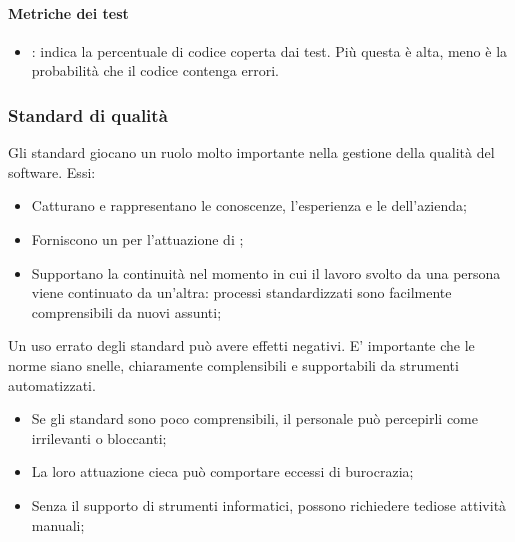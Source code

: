 \paragraph{Metriche dei test}
\label{par:metriche_dei_test}

\begin{itemize}
  \item {}: indica la percentuale di codice coperta
  dai test. Più questa è alta, meno è la probabilità che il codice contenga
  errori.
\end{itemize}

\subsubsection{Standard di qualità}

Gli standard giocano un ruolo molto importante nella gestione della qualità del
software. Essi:

\begin{itemize}
  \item Catturano e rappresentano le conoscenze, l'esperienza e le
     dell'azienda;
  \item Forniscono un  per l'attuazione di ;
  \item Supportano la continuità nel momento in cui il lavoro svolto da una
    persona viene continuato da un'altra: processi standardizzati sono
    facilmente comprensibili da nuovi assunti;
\end{itemize}

Un uso errato degli standard può avere effetti negativi. E' importante che le
norme siano snelle, chiaramente complensibili e supportabili da strumenti
automatizzati.

\begin{itemize}
  \item Se gli standard sono poco comprensibili, il personale può percepirli
    come irrilevanti o bloccanti;
  \item La loro attuazione cieca può comportare eccessi di burocrazia;
  \item Senza il supporto di strumenti informatici, possono richiedere tediose
    attività manuali;
\end{itemize}

